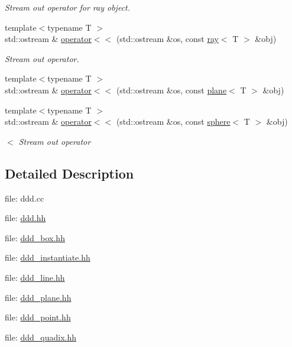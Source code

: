 \begin{DoxyCompactItemize}
\begin{DoxyCompactList}\small\item\em Stream out operator for ray object. \end{DoxyCompactList}\item 
{\footnotesize template$<$typename T $>$ }\\std\+::ostream \& \hyperlink{namespaceddd_ae2604d6c72853dfb2595f6882cbc7a51}{operator$<$$<$} (std\+::ostream \&os, const \hyperlink{classddd_1_1ray}{ray}$<$ T $>$ \&obj)
\begin{DoxyCompactList}\small\item\em Stream out operator. \end{DoxyCompactList}\item 
{\footnotesize template$<$typename T $>$ }\\std\+::ostream \& \hyperlink{namespaceddd_af1faa02295670c7cfd7f0278e3973f84}{operator$<$$<$} (std\+::ostream \&os, const \hyperlink{classddd_1_1plane}{plane}$<$ T $>$ \&obj)
\item 
{\footnotesize template$<$typename T $>$ }\\std\+::ostream \& \hyperlink{namespaceddd_a64dbb41c0ee377eb528907f3448514f6}{operator$<$$<$} (std\+::ostream \&os, const \hyperlink{classddd_1_1sphere}{sphere}$<$ T $>$ \&obj)
\begin{DoxyCompactList}\small\item\em $<$ Stream out operator \end{DoxyCompactList}\end{DoxyCompactItemize}


\subsection{Detailed Description}
file\+: ddd.\+cc

file\+: \hyperlink{ddd_8hh_source}{ddd.\+hh}

file\+: \hyperlink{ddd__box_8hh_source}{ddd\+\_\+box.\+hh}

file\+: \hyperlink{ddd__instantiate_8hh_source}{ddd\+\_\+instantiate.\+hh}

file\+: \hyperlink{ddd__line_8hh_source}{ddd\+\_\+line.\+hh}

file\+: \hyperlink{ddd__plane_8hh_source}{ddd\+\_\+plane.\+hh}

file\+: \hyperlink{ddd__point_8hh_source}{ddd\+\_\+point.\+hh}

file\+: \hyperlink{ddd__quadix_8hh_source}{ddd\+\_\+quadix.\+hh}


